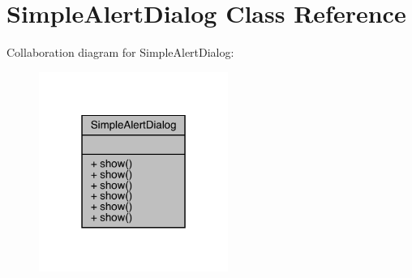\hypertarget{classcom_1_1toast_1_1android_1_1gamebase_1_1base_1_1ui_1_1_simple_alert_dialog}{}\section{Simple\+Alert\+Dialog Class Reference}
\label{classcom_1_1toast_1_1android_1_1gamebase_1_1base_1_1ui_1_1_simple_alert_dialog}


Collaboration diagram for Simple\+Alert\+Dialog\+:
\nopagebreak
\begin{figure}[H]
\begin{center}
\leavevmode
\includegraphics[width=175pt]{classcom_1_1toast_1_1android_1_1gamebase_1_1base_1_1ui_1_1_simple_alert_dialog__coll__graph}
\end{center}
\end{figure}
